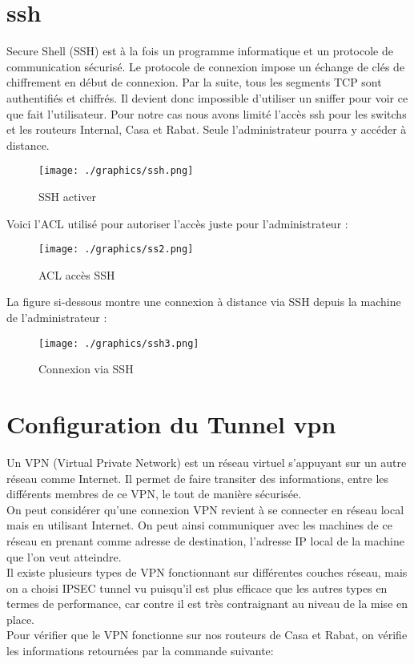 \documentclass[12pt,a4paper]{report}
\begin{document}
		\section{\ac{ssh}}
Secure Shell (SSH) est à la fois un programme informatique et un protocole de communication sécurisé. Le protocole de connexion impose un échange de clés de chiffrement en début de connexion. Par la suite, tous les segments TCP sont authentifiés et chiffrés. Il devient donc impossible d'utiliser un sniffer pour voir ce que fait l'utilisateur.
		Pour notre cas nous avons limité l'accès ssh pour les switchs et les routeurs Internal, Casa et Rabat. Seule l'administrateur pourra y accéder à distance.

		\begin{figure}[!hbtp]
			\centering
			\texttt{[image: ./graphics/ssh.png]}
			\caption{SSH activer}
		\end{figure}

		Voici l'ACL utilisé pour autoriser l'accès juste pour l'administrateur :
		\begin{figure}[!hbtp]
			\centering
			\texttt{[image: ./graphics/ss2.png]}
			\caption{ACL accès SSH}
		\end{figure}
		\newpage
		La figure si-dessous montre une connexion à distance via SSH depuis la machine de l'administrateur :
		\begin{figure}[!hbtp]
			\centering
			\texttt{[image: ./graphics/ssh3.png]}
			\caption{Connexion via SSH}
		\end{figure}


		\section{Configuration du Tunnel \ac{vpn}}		
		Un VPN (Virtual Private Network) est un réseau virtuel s’appuyant sur un autre réseau comme Internet. Il permet de faire transiter des informations, entre les différents membres de ce VPN, le tout de manière sécurisée.\\
On peut considérer qu’une connexion VPN revient à se connecter en réseau local mais en utilisant Internet. On peut ainsi communiquer avec les machines de ce réseau en prenant comme adresse de destination, l’adresse IP local de la machine que l’on veut atteindre.\\
Il existe plusieurs types de VPN fonctionnant sur différentes couches réseau, mais on a choisi IPSEC tunnel vu puisqu'il est plus efficace que les autres types en termes de performance, car contre il est très contraignant au niveau de la mise en place.\\
	\newpage
Pour vérifier que le VPN fonctionne sur nos routeurs de Casa et Rabat, on vérifie les informations retournées par la commande suivante:
\end{document}
